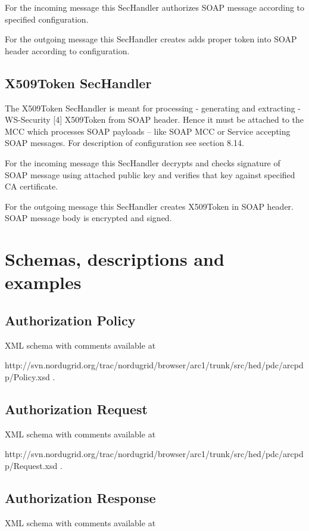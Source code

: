 \documentclass{book}
\begin{document}
For the incoming message this SecHandler authorizes SOAP message according to specified configuration.

For the outgoing message this SecHandler creates adds proper token into SOAP header according to configuration.

\subsection{X509Token SecHandler} %
\label{subsec:x509_token}
The X509Token SecHandler is meant for processing - generating and extracting - WS-Security [4] X509Token from SOAP header. Hence it must be attached to the MCC which processes SOAP payloads – like SOAP MCC or Service accepting SOAP messages. For description of configuration see section 8.14.

For the incoming message this SecHandler decrypts and checks signature of SOAP message using attached public key and verifies that key against specified CA certificate.

For the outgoing message this SecHandler creates X509Token in SOAP header. SOAP message body is encrypted and signed.



\section{Schemas, descriptions and examples} %
\label{sec:schema_description_example}

\subsection{Authorization Policy} %
\label{subsec:authz_policy}
XML schema with comments available at

http://svn.nordugrid.org/trac/nordugrid/browser/arc1/trunk/src/hed/pdc/arcpdp/Policy.xsd .

\subsection{Authorization Request} %
\label{subsec:authz_request}
XML schema with comments available at 

http://svn.nordugrid.org/trac/nordugrid/browser/arc1/trunk/src/hed/pdc/arcpdp/Request.xsd .


\subsection{Authorization Response} %
\label{subsec:authz_response}
XML schema with comments available at 
\end{document}
